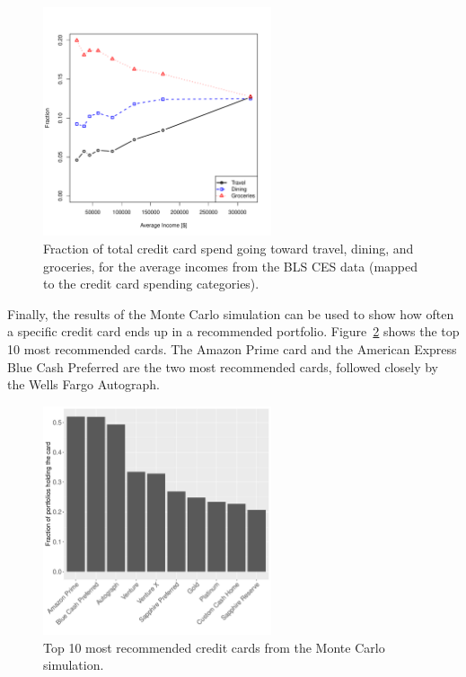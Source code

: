 \begin{figure}[t!h]
    \begin{center}
    \includegraphics[width=0.6\textwidth]{../Figures/TravelDiningFraction.pdf}
    \caption{Fraction of total credit card spend going toward travel, dining, and groceries, for the average incomes from the BLS CES data (mapped to the credit card spending categories).}
    \label{fig:TravelDiningFraction}
    \end{center}
\end{figure}

Finally, the results of the Monte Carlo simulation can be used to show how often a specific credit card ends up in a recommended portfolio. 
Figure~\ref{fig:MC_Popularity_100k} shows the top 10 most recommended cards. 
The Amazon Prime card and the American Express Blue Cash Preferred are the two most recommended cards, followed closely by the Wells Fargo Autograph.

\begin{figure}[t!bh]
    \begin{center}
    \includegraphics[width=0.6\textwidth]{../Figures/MC_Popularity_M100k.pdf}
    \caption{Top 10 most recommended credit cards from the Monte Carlo simulation.}
    \label{fig:MC_Popularity_100k}
    \end{center}
\end{figure}

